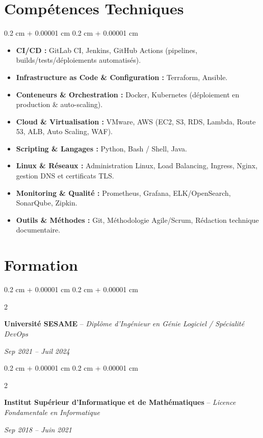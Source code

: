 \documentclass[9pt, letterpaper]{article}
\newenvironment{highlights}{
    \begin{itemize}[
        topsep=0.03 cm,
        parsep=0.03 cm,
        partopsep=0pt,
        itemsep=0pt,
        leftmargin=0.4 cm + 10pt
    ]
}{
    \end{itemize}
}
\newenvironment{onecolentry}{
    \begin{adjustwidth}{
        0.2 cm + 0.00001 cm
    }{
        0.2 cm + 0.00001 cm
    }
}{
    \end{adjustwidth}
}
\newenvironment{twocolentry}[2][]{
    \onecolentry
    \def\secondColumn{#2}
    \setcolumnwidth{\fill, 4.5 cm}
    \begin{paracol}{2}
}{
    \switchcolumn \raggedleft \secondColumn
    \end{paracol}
    \endonecolentry
}
\begin{document}
\section{Compétences Techniques}
\begin{onecolentry}
    \begin{highlights}
        \item \textbf{CI/CD :} GitLab CI, Jenkins, GitHub Actions (pipelines, builds/tests/déploiements automatisés).
        \item \textbf{Infrastructure as Code \& Configuration :} Terraform, Ansible.
        \item \textbf{Conteneurs \& Orchestration :} Docker, Kubernetes (déploiement en production \& auto-scaling).
        \item \textbf{Cloud \& Virtualisation :} VMware, AWS (EC2, S3, RDS, Lambda, Route 53, ALB, Auto Scaling, WAF).
        \item \textbf{Scripting \& Langages :} Python, Bash / Shell, Java.
        \item \textbf{Linux \& Réseaux :} Administration Linux, Load Balancing, Ingress, Nginx, gestion DNS et certificats TLS.
        \item \textbf{Monitoring \& Qualité :} Prometheus, Grafana, ELK/OpenSearch, SonarQube, Zipkin.
        \item \textbf{Outils \& Méthodes :} Git, Méthodologie Agile/Scrum, Rédaction technique documentaire.
    \end{highlights}
\end{onecolentry}

    \vspace{0.3 cm}


    \section{Formation}

    \begin{twocolentry}{\textit{Sep 2021 -- Juil 2024}}
        \textbf{Université SESAME} -- \textit{Diplôme d'Ingénieur en Génie Logiciel / Spécialité DevOps}
    \end{twocolentry}

    \vspace{0.05cm}

    \begin{twocolentry}{\textit{Sep 2018 -- Juin 2021}}
        \textbf{Institut Supérieur d'Informatique et de Mathématiques} -- \textit{Licence Fondamentale en Informatique}
    \end{twocolentry}
\end{document}
